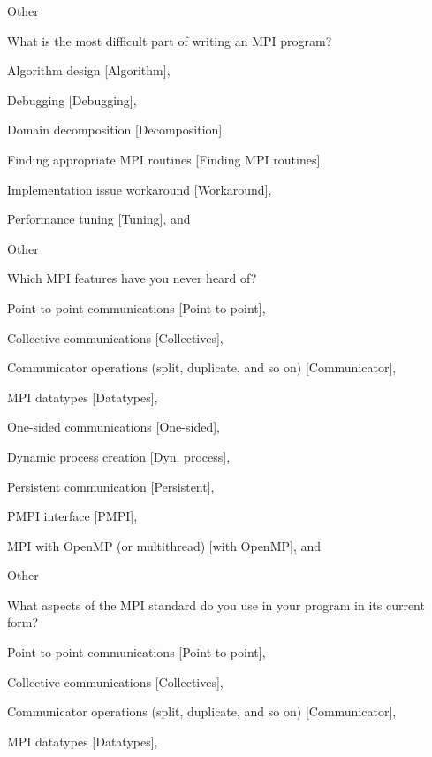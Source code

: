 \documentclass[preprint,5p,times]{elsarticle}
\begin{document}
{{\begin{description}
\begin{inparaenum}[{\bf C}1)]
    \item Other
    \end{inparaenum}
  \item[Q15:] What is the most difficult part of writing an MPI program?
    \begin{inparaenum}[{\bf C}1)]
    \item Algorithm design [Algorithm],
    \item Debugging [Debugging],
    \item Domain decomposition [Decomposition],
    \item Finding appropriate MPI routines [Finding MPI routines],
    \item Implementation issue workaround [Workaround],
    \item Performance tuning [Tuning], and
    \item Other
    \end{inparaenum}
  \item[Q16*:] Which MPI features have you never heard of?
    \begin{inparaenum}[{\bf C}1)]
    \item Point-to-point communications [Point-to-point],
    \item Collective communications [Collectives],
    \item Communicator operations (split, duplicate, and so on) [Communicator],
    \item MPI datatypes [Datatypes],
    \item One-sided communications [One-sided],
    \item Dynamic process creation [Dyn. process],
    \item Persistent communication [Persistent],
    \item PMPI interface [PMPI],
    \item MPI with OpenMP (or multithread) [with OpenMP], and
    \item Other
    \end{inparaenum}
  \item[Q17*:] What aspects of the MPI standard do you use in your program in its current form?
    \begin{inparaenum}[{\bf C}1)]
    \item Point-to-point communications [Point-to-point],
    \item Collective communications [Collectives],
    \item Communicator operations (split, duplicate, and so on) [Communicator],
    \item MPI datatypes [Datatypes],

\end{inparaenum}
\end{description}}}
\end{document}
